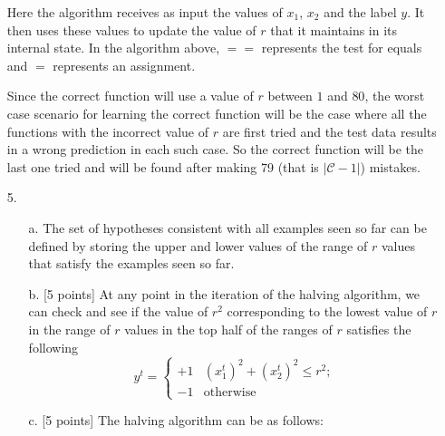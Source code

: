 \begin{enumerate}
Here the algorithm receives as input the values of $x_1$, $x_2$ and the label $y$. It then uses these values to update the value of $r$ that it maintains in its internal state. In the algorithm above, $==$ represents the test for equals and $=$ represents an assignment.

Since the correct function will use a value of $r$ between $1$ and $80$, the worst case scenario for learning the correct function will be the case where all the functions with the incorrect value of $r$ are first tried and the test data results in a wrong prediction in each such case. So the correct function will be the last one tried and will be found after making 79 (that is $\left | \mathcal{C} - 1 \right |$) mistakes. 

\item[5.] 
  \begin{enumerate}
  \item[a.] The set of hypotheses consistent with all examples seen so far can be defined by storing the upper and lower values of the range of $r$ values that satisfy the examples seen so far.
  \item[b.] [5 points] At any point in the iteration of the halving algorithm, we can check and see if the value of $r^2$ corresponding to the lowest value of $r$ in the range of $r$ values in the top half of the ranges of $r$ satisfies the following
   \begin{equation*}
y^t = \left\{
    \begin{array}{rl}
      +1 & (x_1^t)^2 + (x_2^t)^2 \leq r^2;\\
      -1 & \mbox{otherwise}
    \end{array}
\right.
\label{eq:f_r}
\end{equation*}

  \item[c.] [5 points] The halving algorithm can be as follows:
  

\end{enumerate}
\end{enumerate}

